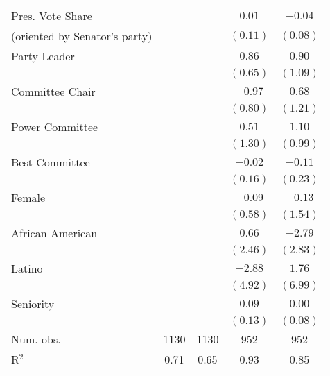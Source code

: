 \documentclass[12pt]{article}
\begin{document}
\begin{table}[!htbp]
\begin{threeparttable}
\begin{tabular}{l c c c c }
Pres. Vote Share                  &             &          & $0.01$      & $-0.04$      \\
  (oriented by Senator's party)   &             &          & $(0.11)$    & $(0.08)$     \\
Party Leader                      &             &          & $0.86$      & $0.90$       \\
                                  &             &          & $(0.65)$    & $(1.09)$     \\
Committee Chair                   &             &          & $-0.97$     & $0.68$       \\
                                  &             &          & $(0.80)$    & $(1.21)$     \\
Power Committee                   &             &          & $0.51$      & $1.10$       \\
                                  &             &          & $(1.30)$    & $(0.99)$     \\
Best Committee                    &             &          & $-0.02$     & $-0.11$      \\
                                  &             &          & $(0.16)$    & $(0.23)$     \\
Female                            &             &          & $-0.09$     & $-0.13$      \\
                                  &             &          & $(0.58)$    & $(1.54)$     \\
African American                  &             &          & $0.66$      & $-2.79$      \\
                                  &             &          & $(2.46)$    & $(2.83)$     \\
Latino                            &             &          & $-2.88$     & $1.76$       \\
                                  &             &          & $(4.92)$    & $(6.99)$     \\
Seniority                         &             &          & $0.09$      & $0.00$       \\
                                  &             &          & $(0.13)$    & $(0.08)$     \\
\hline
Num. obs.                         & 1130        & 1130     & 952         & 952          \\
R$^2$%
                                  & 0.71        & 0.65     & 0.93        & 0.85         \\

\end{tabular}
\end{threeparttable}
\end{table}
\end{document}
